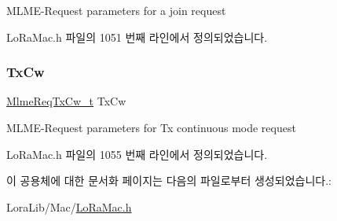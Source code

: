 M\+L\+M\+E-\/\+Request parameters for a join request 

Lo\+Ra\+Mac.\+h 파일의 1051 번째 라인에서 정의되었습니다.

\mbox{\label{unions_mlme_req_1_1u_mlme_param_aa69808af2b2999fc4b8b409b593173ab}} 
\subsubsection{\texorpdfstring{Tx\+Cw}{TxCw}}
{\footnotesize\ttfamily \mbox{\hyperlink{group___l_o_r_a_m_a_c_gab71a9931686ff623fa01ceecc61f1986}{Mlme\+Req\+Tx\+Cw\+\_\+t}} Tx\+Cw}

M\+L\+M\+E-\/\+Request parameters for Tx continuous mode request 

Lo\+Ra\+Mac.\+h 파일의 1055 번째 라인에서 정의되었습니다.



이 공용체에 대한 문서화 페이지는 다음의 파일로부터 생성되었습니다.\+:\begin{DoxyCompactItemize}
\item 
Lora\+Lib/\+Mac/\mbox{\hyperlink{_lo_ra_mac_8h}{Lo\+Ra\+Mac.\+h}}\end{DoxyCompactItemize}
